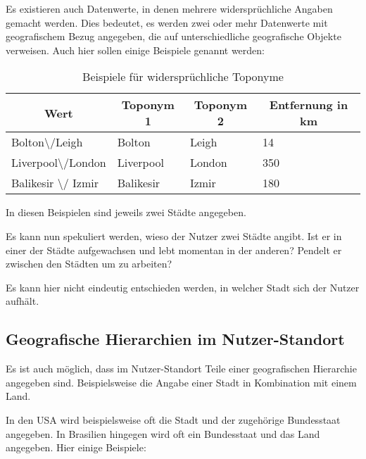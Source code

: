 			Es existieren auch Datenwerte, in denen mehrere widersprüchliche Angaben gemacht werden.
			Dies bedeutet, es werden zwei oder mehr Datenwerte mit geografischem Bezug angegeben, die auf unterschiedliche geografische Objekte verweisen.
			Auch hier sollen einige Beispiele genannt werden:

			\begin{table}[h]
			\centering
			\caption{Beispiele für widersprüchliche Toponyme}
			\label{tab:wiederspruechlicheBezuege}
			\begin{tabular}{|l|l|l|l|}
			\hline
			\multicolumn{1}{|c|}{Wert}      & \multicolumn{1}{c|}{Toponym 1} & \multicolumn{1}{c|}{Toponym 2} & \multicolumn{1}{c|}{Entfernung in km} \\ \hline
			Bolton\textbackslash/Leigh      & Bolton                         & Leigh                          & 14 									\\ \hline
			Liverpool\textbackslash/London  & Liverpool                      & London                         & 350 								\\ \hline
			Balikesir \textbackslash/ Izmir & Balikesir                      & Izmir                          & 180 								\\ \hline
			\end{tabular}
			\end{table}					
				
			In diesen Beispielen sind jeweils zwei Städte angegeben.

			Es kann nun spekuliert werden, wieso der Nutzer zwei Städte angibt.
			Ist er in einer der Städte aufgewachsen und lebt momentan in der anderen?
			Pendelt er zwischen den Städten um zu arbeiten?

			Es kann hier nicht eindeutig entschieden werden, in welcher Stadt sich der Nutzer aufhält.

		\subsection{Geografische Hierarchien im Nutzer-Standort} \label{sub:geografischeHierarchienImNutzerStandort} 

			Es ist auch möglich, dass im Nutzer-Standort Teile einer geografischen Hierarchie angegeben sind.
			Beispielsweise die Angabe einer Stadt in Kombination mit einem Land.
			
			In den USA wird beispielsweise oft die Stadt und der zugehörige Bundesstaat angegeben.
			In Brasilien hingegen wird oft ein Bundesstaat und das Land angegeben.
			Hier einige Beispiele:

